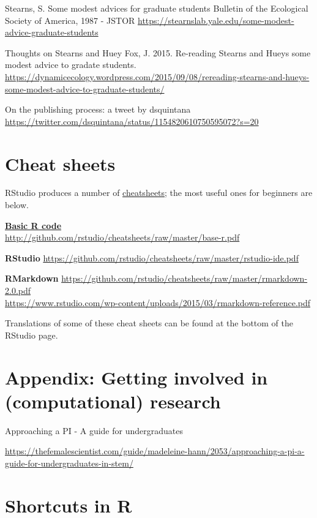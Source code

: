 \documentclass[
]{book}
\begin{document}
Stearns, S. Some modest advices for graduate students
Bulletin of the Ecological Society of America, 1987 - JSTOR
\url{https://stearnslab.yale.edu/some-modest-advice-graduate-students}

Thoughts on Stearns and Huey
Fox, J. 2015. Re-reading Stearns and Hueys some modest advice to gradate students.
\url{https://dynamicecology.wordpress.com/2015/09/08/rereading-stearns-and-hueys-some-modest-advice-to-graduate-students/}

On the publishing process: a tweet by dsquintana
\url{https://twitter.com/dsquintana/status/1154820610750595072?s=20}

\hypertarget{cheat-sheets}{%
\chapter{Cheat sheets}\label{cheat-sheets}}

RStudio produces a number of \href{https://www.rstudio.com/resources/cheatsheets/\#ide}{cheatsheets}; the most useful ones for beginners are below.

\href{http://github.com/rstudio/cheatsheets/raw/master/base-r.pdf}{\textbf{Basic R code}}\\
\url{http://github.com/rstudio/cheatsheets/raw/master/base-r.pdf}

\textbf{RStudio}
\url{https://github.com/rstudio/cheatsheets/raw/master/rstudio-ide.pdf}

\textbf{RMarkdown}
\url{https://github.com/rstudio/cheatsheets/raw/master/rmarkdown-2.0.pdf}\\
\url{https://www.rstudio.com/wp-content/uploads/2015/03/rmarkdown-reference.pdf}

Translations of some of these cheat sheets can be found at the bottom of the RStudio page.

\hypertarget{appendix-getting-involved-in-computational-research}{%
\chapter{Appendix: Getting involved in (computational) research}\label{appendix-getting-involved-in-computational-research}}

Approaching a PI - A guide for undergraduates

\url{https://thefemalescientist.com/guide/madeleine-hann/2053/approaching-a-pi-a-guide-for-undergraduates-in-stem/}

\hypertarget{shortcuts-in-r}{%
\chapter{Shortcuts in R}\label{shortcuts-in-r}}
\end{document}
